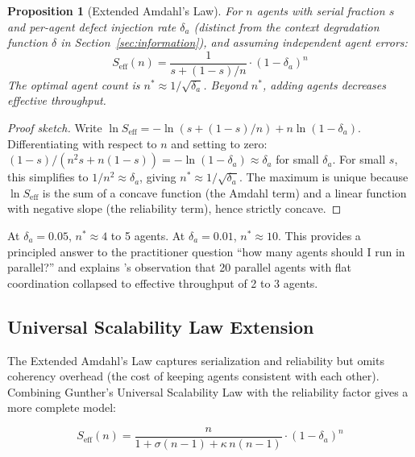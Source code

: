 \documentclass[11pt, a4paper, logo, copyright]{googledeepmind}
\newtheorem{proposition}{Proposition}[section]
\begin{document}
\begin{proposition}[Extended Amdahl's Law]
\label{thm:extended-amdahl}
For $n$ agents with serial fraction $s$ and per-agent defect injection rate $\delta_a$ (distinct from the context degradation function $\delta$ in Section~\ref{sec:information}), and assuming independent agent errors:
\begin{equation}
    S_{\text{eff}}(n) = \frac{1}{s + (1-s)/n} \cdot (1-\delta_a)^n
\end{equation}
The optimal agent count is $n^* \approx 1/\sqrt{\delta_a}$. Beyond $n^*$, adding agents \emph{decreases} effective throughput.
\end{proposition}

\begin{proof}[Proof sketch]
Write $\ln S_{\mathrm{eff}} = -\ln(s + (1-s)/n) + n \ln(1-\delta_a)$.
Differentiating with respect to $n$ and setting to zero:
$(1-s)/(n^2 s + n(1-s)) = -\ln(1-\delta_a) \approx \delta_a$ for small $\delta_a$.
For small $s$, this simplifies to $1/n^2 \approx \delta_a$, giving $n^* \approx 1/\sqrt{\delta_a}$.
The maximum is unique because $\ln S_{\mathrm{eff}}$ is the sum of a concave function (the Amdahl term) and a linear function with negative slope (the reliability term), hence strictly concave.
\end{proof}

At $\delta_a = 0.05$, $n^* \approx 4$ to 5 agents. At $\delta_a = 0.01$, $n^* \approx 10$. This provides a principled answer to the practitioner question ``how many agents should I run in parallel?'' and explains \citeauthor{Cursor2026}'s observation that 20 parallel agents with flat coordination collapsed to effective throughput of 2 to 3 agents.

\subsection{Universal Scalability Law Extension}

The Extended Amdahl's Law captures serialization and reliability but omits coherency overhead (the cost of keeping agents consistent with each other). Combining Gunther's Universal Scalability Law \citep{gunther2008usl} with the reliability factor gives a more complete model:

\begin{equation}
\label{eq:usl-extended}
    S_{\mathrm{eff}}(n) = \frac{n}{1 + \sigma(n-1) + \kappa \, n(n-1)} \cdot (1-\delta_a)^n
\end{equation}
\end{document}
